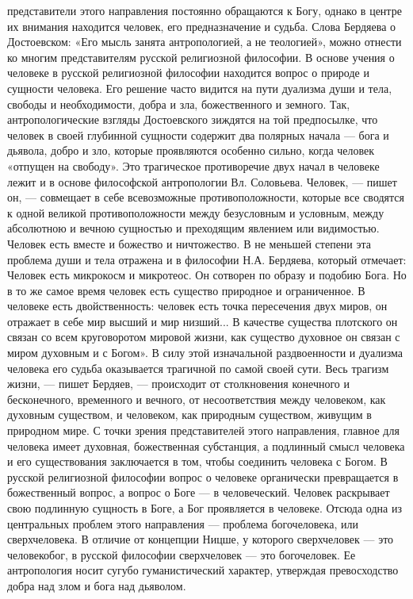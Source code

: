 \documentclass[12pt]{article}
\begin{document}
представители  этого  направления  постоянно  обращаются  к  Богу,  однако  в  центре  их  внимания  находится
человек, его предназначение и судьба. Слова Бердяева о Достоевском: «Его мысль занята антропологией, а не
теологией», можно отнести ко многим представителям русской религиозной философии.
В  основе  учения  о  человеке  в  русской  религиозной  философии  находится  вопрос  о  природе  и  сущности
человека. Его решение часто видится на пути дуализма души и тела, свободы и необходимости, добра и зла,
божественного и земного. Так, антропологические взгляды Достоевского зиждятся на той предпосылке, что
человек в своей глубинной сущности содержит два полярных начала — бога и дьявола, добро и зло, которые
проявляются особенно сильно, когда человек «отпущен на свободу».
Это  трагическое  противоречие  двух  начал  в  человеке  лежит  и  в  основе  философской  антропологии  Вл.
Соловьева.
Человек, — пишет он, — совмещает в себе всевозможные противоположности, которые все сводятся к одной
великой  противоположности  между  безусловным  и  условным,  между  абсолютною  и  вечною  сущностью  и
преходящим явлением или видимостью. Человек есть вместе и божество и ничтожество.
В не меньшей степени эта проблема души и тела отражена и в философии Н.А. Бердяева, который отмечает:
Человек есть микрокосм и микротеос. Он сотворен по образу и подобию Бога. Но в то же самое время человек
есть существо природное и ограниченное. В человеке есть двойственность: человек есть точка пересечения
двух миров, он отражает в себе мир высший и мир низший... В качестве существа плотского он связан со всем
круговоротом мировой жизни, как существо духовное он связан с миром духовным и с Богом».
В силу этой изначальной раздвоенности и дуализма человека его судьба оказывается трагичной по самой своей
сути.
Весь трагизм жизни, — пишет Бердяев, — происходит от столкновения конечного и бесконечного, временного и
вечного,  от  несоответствия  между  человеком,  как  духовным  существом,  и  человеком,  как  природным
существом, живущим в природном мире.
С  точки  зрения  представителей  этого  направления,  главное  для  человека  имеет  духовная,  божественная
субстанция, а подлинный смысл человека и его существования заключается в том, чтобы соединить человека с
Богом.  В  русской  религиозной  философии  вопрос  о  человеке  органически  превращается  в  божественный
вопрос, а вопрос о Боге — в человеческий. Человек раскрывает свою подлинную сущность в Боге, а Бог
проявляется в человеке. Отсюда одна из центральных проблем этого направления — проблема богочеловека,
или сверхчеловека. В отличие от концепции Ницше, у которого сверхчеловек — это человекобог, в русской
философии  сверхчеловек  —  это  богочеловек.  Ее  антропология  носит  сугубо  гуманистический  характер,
утверждая превосходство добра над злом и бога над дьяволом.
\end{document}
